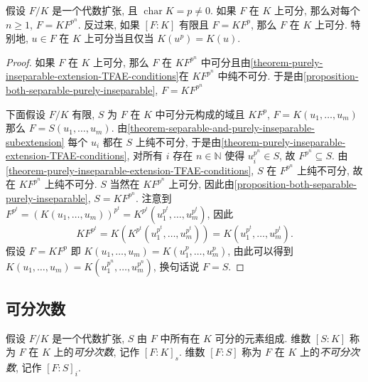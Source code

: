\begin{corollary}
  假设 \( F/K \) 是一个代数扩张, 且 \( \operatorname{char} K = p \neq 0 \). 如果
  \( F \) 在 \( K \) 上可分, 那么对每个 \( n \geq 1 \), \( F = KF^{p^n} \).
  反过来, 如果 \( [F: K] \) 有限且 \( F = KF^p \), 那么 \( F \) 在 \( K \)
  上可分.
  特别地, \( u \in F \) 在 \( K \) 上可分当且仅当 \( K(u^p) = K(u) \).
\end{corollary}
\begin{proof}
  如果 \( F \) 在 \( K \) 上可分, 那么 \( F \) 在 \( KF^{p^n} \)
  中可分且由\cref{theorem-purely-inseparable-extension-TFAE-conditions}在 \(
  KF^{p^n} \) 中纯不可分.
  于是由\cref{proposition-both-separable-purely-inseparable}, \( F = KF^{p^n} \)

  下面假设 \( F/K \) 有限, \( S \) 为 \( F \) 在 \( K \) 中可分元构成的域且 \(
  KF^p \), \( F = K(u_1, \ldots, u_m) \) 那么 \( F = S(u_1, \ldots, u_m) \).
  由\cref{theorem-separable-and-purely-inseparable-subextension} 每个 \( u_i \)
  都在 \( S \) 上纯不可分,
  于是由\cref{theorem-purely-inseparable-extension-TFAE-conditions}, 对所有 \( i
  \) 存在 \( n \in \mathbb{N} \) 使得 \( u_i^{p^n} \in S \), 故 \( F^{p^n}
  \subseteq S \).
  由 \cref{theorem-purely-inseparable-extension-TFAE-conditions}, \( S \) 在 \(
  F^{p^n} \) 上纯不可分, 故在 \( KF^{p^n} \) 上纯不可分.
  \( S \) 当然在 \( KF^{p^n} \) 上可分,
  因此由\cref{proposition-both-separable-purely-inseparable}, \( S = KF^{p^n} \).
  注意到 \( F^{p^t} = (K(u_1, \ldots, u_m))^{p^t} = K^{p^t}(u_1^{p^t}, \ldots,
  u_m^{p^t}) \), 因此
  \[
    KF^{p^t} = K(K^{p^t}(u_1^{p^t}, \ldots, u_m^{p^t})) = K(u_1^{p^t}, \ldots,
    u^{p^t}_m).
  \]
  假设 \( F = KF^p \) 即 \( K(u_1, \ldots, u_m) = K(u_1^p, \ldots, u_m^p) \),
  由此可以得到 \( K(u_1, \ldots, u_m) = K(u_1^{p^n}, \ldots, u^{p^n}_m) \),
  换句话说 \( F = S \).
\end{proof}

\subsection{可分次数}

假设 \( F/K \) 是一个代数扩张, \( S \) 由 \( F \) 中所有在 \( K \)
可分的元素组成.
维数 \( [S:K] \) 称为 \( F \) 在 \( K \) 上的\emph{可分次数}, 记作 \( [F:K]_s
\).
维数 \( [F:S] \) 称为 \( F \) 在 \( K \) 上的\emph{不可分次数}, 记作 \( [F:S]_i
\).

